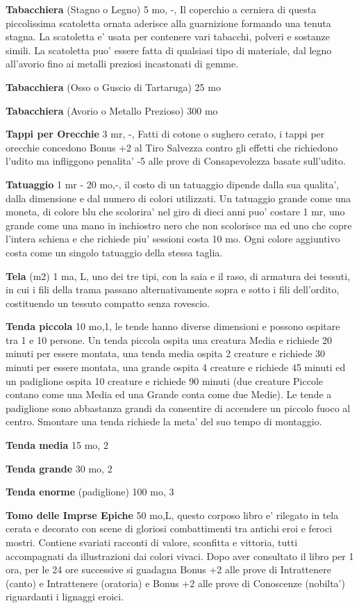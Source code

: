 \documentclass[a4paper,11pt,twoside,openany]{book}
\begin{document}
{\textbf{Tabacchiera} (Stagno o Legno) 5 mo, -, Il coperchio a cerniera di questa piccolissima scatoletta ornata aderisce alla guarnizione formando una tenuta stagna. La scatoletta e' usata per contenere vari tabacchi, polveri e sostanze simili. La scatoletta puo' essere fatta di qualsiasi tipo di materiale, dal legno all'avorio fino ai metalli preziosi incastonati di gemme.

\textbf{Tabacchiera} (Osso o Guscio di Tartaruga) 25 mo

\textbf{Tabacchiera} (Avorio o Metallo Prezioso) 300 mo

\textbf{Tappi per Orecchie} 3 mr, -, Fatti di cotone o sughero cerato, i tappi per orecchie concedono Bonus +2 al Tiro Salvezza contro gli effetti che richiedono l'udito ma infliggono penalita' -5 alle prove di Consapevolezza basate sull'udito.

\textbf{Tatuaggio} 1 mr - 20 mo,-, il costo di un tatuaggio dipende dalla sua qualita', dalla dimensione e dal numero di colori utilizzati. Un tatuaggio grande come una moneta, di colore blu che scolorira' nel giro di dieci anni puo' costare 1 mr, uno grande come una mano in inchiostro nero che non scolorisce ma ed uno che copre l'intera schiena e che richiede piu' sessioni costa 10 mo. 
Ogni colore aggiuntivo costa come un singolo tatuaggio della stessa taglia.

\textbf{Tela} (m2) 1 ma, L, uno dei tre tipi, con la saia e il raso, di armatura dei tessuti, in cui i fili della trama passano alternativamente sopra e sotto i fili dell'ordito, costituendo un tessuto compatto senza rovescio.

\textbf{Tenda piccola} 10 mo,1, le tende hanno diverse dimensioni e possono ospitare tra 1 e 10 persone. Un tenda piccola ospita una creatura Media e richiede 20 minuti per essere montata, una tenda media ospita 2 creature e richiede 30 minuti per essere montata, una grande ospita 4 creature e richiede 45 minuti ed un padiglione ospita 10 creature e richiede 90 minuti (due creature Piccole contano come una Media ed una Grande conta come due Medie). Le tende a padiglione sono abbastanza grandi da consentire di accendere un piccolo fuoco al centro. Smontare una tenda richiede la meta' del suo tempo di montaggio.

\textbf{Tenda media} 15 mo, 2

\textbf{Tenda grande} 30 mo, 2

\textbf{Tenda enorme} (padiglione) 100 mo, 3

\textbf{Tomo delle Imprse Epiche} 50 mo,L, questo corposo libro e' rilegato in tela cerata e decorato con scene di gloriosi combattimenti tra antichi eroi e feroci mostri.
Contiene svariati racconti di valore, sconfitta e vittoria, tutti accompagnati da illustrazioni dai colori vivaci.
Dopo aver consultato il libro per 1 ora, per le 24 ore successive si guadagna Bonus +2 alle prove di Intrattenere (canto) e Intrattenere (oratoria) e Bonus +2 alle prove di Conoscenze (nobilta') riguardanti i lignaggi eroici.

}
\end{document}
